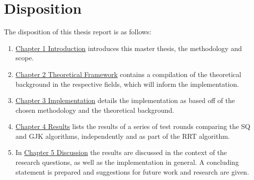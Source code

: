\section{Disposition}

The disposition of this thesis report is as follows:

\begin{enumerate}%
	\item[] \hyperref[ch1:introduction]{Chapter 1 Introduction} introduces this master thesis, the methodology and scope. 
	\item[] \hyperref[ch2:theoframe]{Chapter 2 Theoretical Framework}  contains a compilation of the theoretical background in the respective fields, which will inform the implementation. 
	\item[] \hyperref[ch3:implement]{Chapter 3 Implementation} details the implementation as based off of the chosen methodology and the theoretical background.
	\item[] \hyperref[ch4:resu]{Chapter 4 Results} lists the results of a series of test rounds comparing the \gls{SQ} and \gls{GJK} algorithms, independently and as part of the \gls{RRT} algorithm.
	\item[] In \hyperref[ch5:discussion]{Chapter 5 Discussion} the results are discussed in the context of the research questions, as well as the implementation in general. A concluding statement is prepared and suggestions for future work and research are given.
\end{enumerate} 

